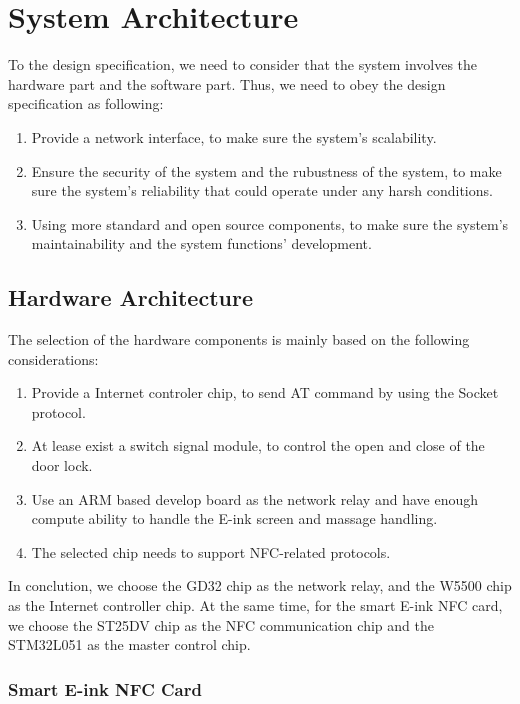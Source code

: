 \documentclass[11pt, a4paper]{article}
\begin{document}
\section{System Architecture}
To the design specification, we need to consider that the system involves the hardware part and the software part.
Thus, we need to obey the design specification as following:

\begin{enumerate}[1.]
    \item Provide a network interface, to make sure the system's scalability.
    \item Ensure the security of the system and the rubustness of the system, to make sure the system's reliability that could operate under any harsh conditions.
    \item Using more standard and open source components, to make sure the system's maintainability and the system functions' development.
\end{enumerate}


\subsection{Hardware Architecture}

The selection of the hardware components is mainly based on the following considerations:

\begin{enumerate}[1.]
    \item Provide a Internet controler chip, to send AT command by using the Socket protocol.
    \item At lease exist a switch signal module, to control the open and close of the door lock.
    \item Use an ARM based develop board as the network relay and have enough compute ability to handle the E-ink screen and massage handling.
    \item The selected chip needs to support NFC-related protocols.
\end{enumerate}

In conclution, we choose the GD32 chip as the network relay, and the W5500 chip as the Internet controller chip.
At the same time, for the smart E-ink NFC card, we choose the ST25DV chip as the NFC communication chip and the STM32L051 as the master control chip.

\subsubsection{Smart E-ink NFC Card}
\end{document}
